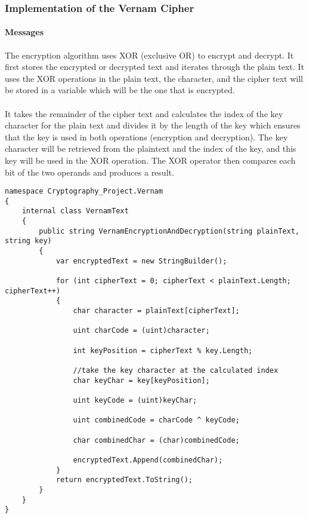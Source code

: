 \subsubsection{Implementation of the Vernam Cipher}

\paragraph{Messages\\}
The encryption algorithm uses XOR (exclusive OR) to encrypt and decrypt. It first stores the encrypted or decrypted text and iterates through the plain text. It uses the XOR operations in the plain text, the character, and the cipher text will be stored in a variable which will be the one that is encrypted.\\ 
\\It takes the remainder of the cipher text and calculates the index of the key character for the plain text and divides it by the length of the key which ensures that the key is used in both operations (encryption and decryption). The key character will be retrieved from the plaintext and the index of the key, and this key will be used in the XOR operation. The XOR operator then compares each bit of the two operands and produces a result.



\begin{lstlisting}[caption=Vernam Cipher Text Source Code]
namespace Cryptography_Project.Vernam
{
    internal class VernamText
    {
        public string VernamEncryptionAndDecryption(string plainText, string key)
        {
            var encryptedText = new StringBuilder(); 

            for (int cipherText = 0; cipherText < plainText.Length; cipherText++) 
            {
                char character = plainText[cipherText]; 

                uint charCode = (uint)character; 

                int keyPosition = cipherText % key.Length; 

                //take the key character at the calculated index
                char keyChar = key[keyPosition]; 

                uint keyCode = (uint)keyChar; 

                uint combinedCode = charCode ^ keyCode; 

                char combinedChar = (char)combinedCode; 

                encryptedText.Append(combinedChar);
            }
            return encryptedText.ToString();
        }
    }
}
\end{lstlisting}

